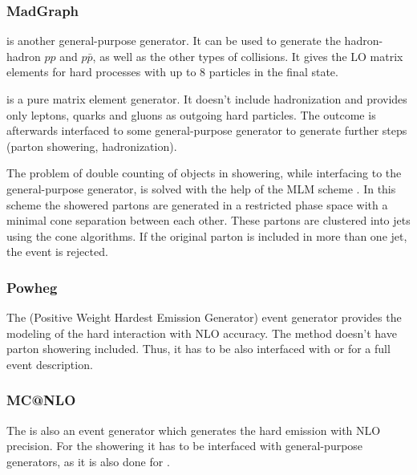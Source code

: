 \subsubsection{MadGraph}

\MG\cite{Alwall:2011uj} is another general-purpose generator. It can be used to generate the hadron-hadron $pp$ and $p\bar{p}$, as well as the other types of collisions.
It gives the LO matrix elements for hard processes with up to 8 particles in the final state. 

\MG is a pure matrix element generator. It doesn't include hadronization and provides only leptons, quarks and gluons as outgoing hard particles. 
The outcome is afterwards interfaced to some general-purpose generator to generate further steps (parton showering, hadronization). 

The problem of double counting of objects in showering, while interfacing \MG to the general-purpose generator, is solved with the help of the 
MLM scheme \cite{Mrenna:2003if}. In this scheme the showered partons are generated in a restricted phase space with a minimal cone separation
between each other. These partons are clustered into jets using the cone algorithms. If the original parton is included in more than one jet,
the event is rejected.

\subsubsection{Powheg}

The \Powheg (Positive Weight Hardest Emission Generator) event generator \cite{Frixione:2007vw} provides the modeling of the hard interaction 
with NLO accuracy. The \Powheg method doesn't have parton showering included. Thus, it has to be also interfaced with \PYTHIA or
\HERWIG for a full event description.

\subsubsection{MC@NLO}

The \MCNLO \cite{Frixione:2002ik} is also an event generator which generates the hard emission with NLO precision. For the showering
it has to be interfaced with general-purpose generators, as it is also done for \Powheg. 

